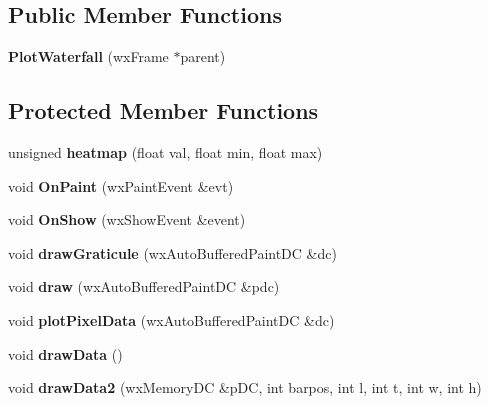 \subsection*{Public Member Functions}
\begin{DoxyCompactItemize}
\item 
\hypertarget{class_plot_waterfall_ab8cb1de06d17616f05ab872923563167}{{\bfseries Plot\-Waterfall} (wx\-Frame $\ast$parent)}\label{class_plot_waterfall_ab8cb1de06d17616f05ab872923563167}

\end{DoxyCompactItemize}
\subsection*{Protected Member Functions}
\begin{DoxyCompactItemize}
\item 
\hypertarget{class_plot_waterfall_a9258386bf42d94ddda768e4e767a77aa}{unsigned {\bfseries heatmap} (float val, float min, float max)}\label{class_plot_waterfall_a9258386bf42d94ddda768e4e767a77aa}

\item 
\hypertarget{class_plot_waterfall_a37d541349ac6f010a90fee3b9f32fbbb}{void {\bfseries On\-Paint} (wx\-Paint\-Event \&evt)}\label{class_plot_waterfall_a37d541349ac6f010a90fee3b9f32fbbb}

\item 
\hypertarget{class_plot_waterfall_ad55e0e3078f0d5c3699df36ba6d8ab5d}{void {\bfseries On\-Show} (wx\-Show\-Event \&event)}\label{class_plot_waterfall_ad55e0e3078f0d5c3699df36ba6d8ab5d}

\item 
\hypertarget{class_plot_waterfall_aa97d243b7bb91238b7493dcb96139803}{void {\bfseries draw\-Graticule} (wx\-Auto\-Buffered\-Paint\-D\-C \&dc)}\label{class_plot_waterfall_aa97d243b7bb91238b7493dcb96139803}

\item 
\hypertarget{class_plot_waterfall_a86c6b3a9dc720b681f7b4e47d1fe193d}{void {\bfseries draw} (wx\-Auto\-Buffered\-Paint\-D\-C \&pdc)}\label{class_plot_waterfall_a86c6b3a9dc720b681f7b4e47d1fe193d}

\item 
\hypertarget{class_plot_waterfall_aec560c10f32a6c6e92a62225288c28f3}{void {\bfseries plot\-Pixel\-Data} (wx\-Auto\-Buffered\-Paint\-D\-C \&dc)}\label{class_plot_waterfall_aec560c10f32a6c6e92a62225288c28f3}

\item 
\hypertarget{class_plot_waterfall_aeb0731ac7eeecd219980637ac70b4c76}{void {\bfseries draw\-Data} ()}\label{class_plot_waterfall_aeb0731ac7eeecd219980637ac70b4c76}

\item 
\hypertarget{class_plot_waterfall_a6825ebbd247988bf052d29ebca72d02e}{void {\bfseries draw\-Data2} (wx\-Memory\-D\-C \&p\-D\-C, int barpos, int l, int t, int w, int h)}\label{class_plot_waterfall_a6825ebbd247988bf052d29ebca72d02e}

\end{DoxyCompactItemize}
